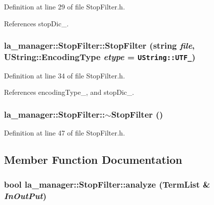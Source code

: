 Definition at line 29 of file StopFilter.h.

References stopDic\_\-.\hypertarget{classla__manager_1_1StopFilter_31faf375353246498973fbf51e0c3bdc}{
\subsubsection[{StopFilter}]{\setlength{\rightskip}{0pt plus 5cm}la\_\-manager::StopFilter::StopFilter (string {\em file}, \/  UString::EncodingType {\em etype} = {\tt UString::UTF\_})}}
\label{classla__manager_1_1StopFilter_31faf375353246498973fbf51e0c3bdc}




Definition at line 34 of file StopFilter.h.

References encodingType\_\-, and stopDic\_\-.\hypertarget{classla__manager_1_1StopFilter_db5d462aacd49faefbdcf1ec28aacd67}{
\subsubsection[{$\sim$StopFilter}]{\setlength{\rightskip}{0pt plus 5cm}la\_\-manager::StopFilter::$\sim$StopFilter ()}}
\label{classla__manager_1_1StopFilter_db5d462aacd49faefbdcf1ec28aacd67}




Definition at line 47 of file StopFilter.h.

\subsection{Member Function Documentation}
\hypertarget{classla__manager_1_1StopFilter_17b962063274fdae433e111a39d80f22}{
\subsubsection[{analyze}]{\setlength{\rightskip}{0pt plus 5cm}bool la\_\-manager::StopFilter::analyze ({\bf TermList} \& {\em InOutPut})}}
\label{classla__manager_1_1StopFilter_17b962063274fdae433e111a39d80f22}


